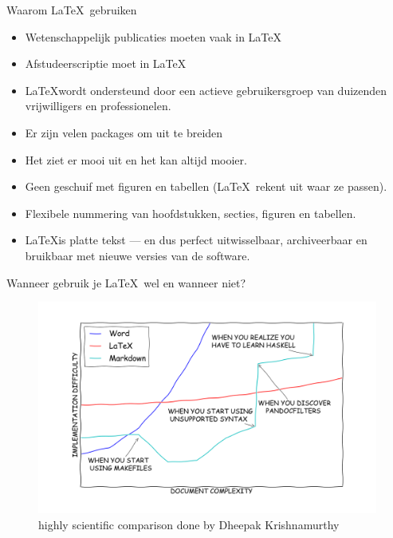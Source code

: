 \documentclass{beamer}
\begin{document}
\begin{frame}[fragile]{Waarom \LaTeX\ gebruiken}

\begin{itemize}
\item Wetenschappelijk publicaties moeten vaak in \LaTeX
\item Afstudeerscriptie moet in \LaTeX
\item \LaTeX wordt ondersteund door een actieve gebruikersgroep van duizenden vrijwilligers en professionelen.
\item Er zijn velen packages om uit te breiden
\item Het ziet er mooi uit en het kan altijd mooier.
\item Geen geschuif met figuren en tabellen (\LaTeX\ rekent uit waar ze passen).
\item Flexibele nummering van hoofdstukken, secties, figuren en tabellen.
\item \LaTeX is platte tekst — en dus perfect uitwisselbaar, archiveerbaar en bruikbaar met nieuwe versies van de software.
\end{itemize}
\end{frame}

\begin{frame}[fragile]{Wanneer gebruik je \LaTeX\ wel en wanneer niet?}

\begin{figure}
\centering
\includegraphics[width=1\textwidth]{images/learningcurve.png}
\caption{highly scientific comparison done by Dheepak Krishnamurthy}
\end{figure}

\end{frame}
\end{document}
